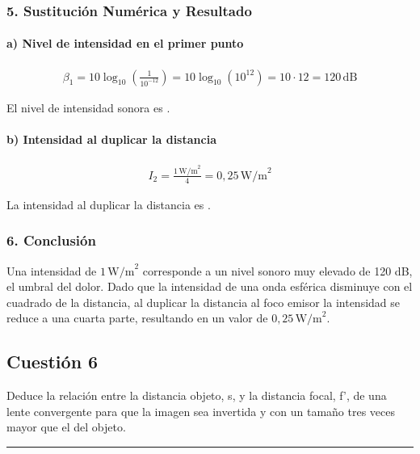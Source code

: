 \subsubsection*{5. Sustitución Numérica y Resultado}
\paragraph*{a) Nivel de intensidad en el primer punto}
\begin{gather}
    \beta_1 = 10 \log_{10}\left(\frac{1}{10^{-12}}\right) = 10 \log_{10}(10^{12}) = 10 \cdot 12 = 120 \, \text{dB}
\end{gather}
\begin{cajaresultado}
    El nivel de intensidad sonora es .
\end{cajaresultado}
\paragraph*{b) Intensidad al duplicar la distancia}
\begin{gather}
    I_2 = \frac{1 \, \text{W/m}^2}{4} = 0,25 \, \text{W/m}^2
\end{gather}
\begin{cajaresultado}
    La intensidad al duplicar la distancia es .
\end{cajaresultado}

\subsubsection*{6. Conclusión}
\begin{cajaconclusion}
Una intensidad de $1\,\text{W/m}^2$ corresponde a un nivel sonoro muy elevado de 120 dB, el umbral del dolor. Dado que la intensidad de una onda esférica disminuye con el cuadrado de la distancia, al duplicar la distancia al foco emisor la intensidad se reduce a una cuarta parte, resultando en un valor de $0,25\,\text{W/m}^2$.
\end{cajaconclusion}

\newpage
\subsection{Cuestión 6}
\label{subsec:C6_2020_jul_ext_b}

\begin{cajaenunciado}
Deduce la relación entre la distancia objeto, s, y la distancia focal, f', de una lente convergente para que la imagen sea invertida y con un tamaño tres veces mayor que el del objeto.
\end{cajaenunciado}
\hrule

